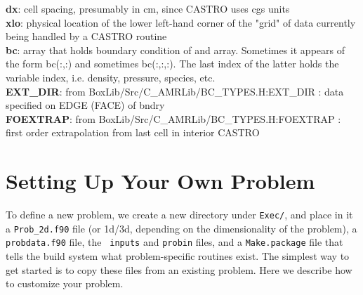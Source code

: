 {\bf dx}: cell spacing, presumably in cm, since CASTRO uses cgs
units\\

{\bf xlo}: physical location of the lower left-hand corner of the
"grid" of data currently being handled by a CASTRO routine\\

{\bf bc}: array that holds boundary condition of and array. Sometimes
it appears of the form bc(:,:) and sometimes bc(:,:,:). The last index
of the latter holds the variable index, i.e. density, pressure,
species, etc.\\

{\bf EXT\_DIR}: from BoxLib/Src/C\_AMRLib/BC\_TYPES.H:EXT\_DIR : data
specified on EDGE (FACE) of bndry\\

{\bf FOEXTRAP}: from BoxLib/Src/C\_AMRLib/BC\_TYPES.H:FOEXTRAP : first
order extrapolation from last cell in interior CASTRO


\section{Setting Up Your Own Problem}

To define a new problem, we create a new directory under {\tt Exec/},
and place in it a {\tt Prob\_2d.f90} file (or 1d/3d, depending on the
dimensionality of the problem), a {\tt probdata.f90} file, the {\tt
  inputs} and {\tt probin} files, and a {\tt Make.package} file that
tells the build system what problem-specific routines exist.  The
simplest way to get started is to copy these files from an existing
problem.  Here we describe how to customize your problem.

